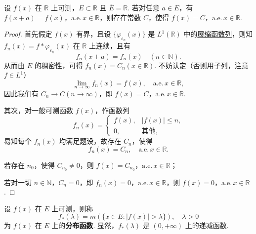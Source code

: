 \documentclass[../../main.tex]{subfiles}%
\begin{document}
\begin{example}
设 \( f(x) \) 在 \( \mathbb{R} \) 上可测，\( E \subset \mathbb{R} \) 且 \( \overline{E} = \mathbb{R} \). 若对任意 \( a \in E \)，有 \( f(x + a) = f(x) \)，\(\text{a.e.}\, x \in \mathbb{R} \)，则存在常数 \( C \)，使得 \( f(x) = C \)，\(\text{a.e.}\, x \in \mathbb{R} \).
\end{example}
\begin{proof}
首先假定 \( f(x) \) 有界，且设 \( \{ \varphi_{\varepsilon_n}(x) \} \) 是 \( L^1(\mathbb{R}) \) 中的\hyperref[definition:展缩函数]{展缩函数列}，则知 \( f_n(x) = f * \varphi_{\varepsilon_n}(x) \) 在 \( \mathbb{R} \) 上连续，且有
\[
f_n(x + a) = f_n(x) \quad (n \in \mathbb{N}).
\]
从而由 \( E \) 的稠密性，可得 \( f_n(x) = C_n (x \in \mathbb{R}) \). 不妨认定（否则用子列，注意 \( f \in L^1 \)）
\[
\lim_{n \to \infty} f_n(x) = f(x), \quad \text{a.e.}\, x \in \mathbb{R},
\]
因此我们有 \( C_n \to C (n \to \infty) \)，即 \( f(x) = C \)，\(\text{a.e.}\, x \in \mathbb{R} \).

其次，对一般可测函数 \( f(x) \)，作函数列
\[
f_n(x) = 
\begin{cases} 
f(x), & |f(x)| \leqslant  n, \\
0, & \text{其他},
\end{cases}
\]
易知每个 \( f_n(x) \) 均满足题设，故存在 \( C_n \)，使得
\[
f_n(x) = C_n, \quad \text{a.e.}\, x \in \mathbb{R}.
\]

若存在 \( n_0 \)，使得 \( C_{n_0} \neq 0 \)，则 \( f(x) = C_{n_0} \)，\(\text{a.e.}\, x \in \mathbb{R} \)；

若对一切 \( n \in \mathbb{N} \)，\( C_n = 0 \)，即 \( f_n(x) = 0 \)，\(\text{a.e.}\, x \in \mathbb{R} \)，则 \( f(x) = 0 \)，\(\text{a.e.}\, x \in \mathbb{R} \).
\end{proof}

\begin{definition}[分布函数]
设 \( f(x) \) 在 \( E \) 上可测，则称
\[
f_*(\lambda) = m(\{ x \in E : |f(x)| > \lambda \}), \quad \lambda > 0
\]
为 \( f(x) \) 在 \( E \) 上的\textbf{分布函数}. 显然，\( f_*(\lambda) \) 是 \( (0, +\infty) \) 上的递减函数.
\end{definition}
\end{document}
